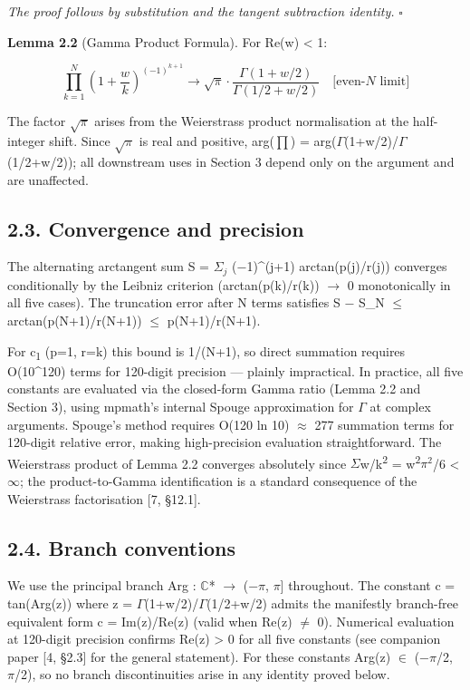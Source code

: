 \documentclass[11pt]{article}
\begin{document}
\emph{The proof follows by substitution and the tangent subtraction
identity.} \(\square\)

\textbf{Lemma 2.2} (Gamma Product Formula). For Re(w) \textless{} 1:

\[\prod_{k=1}^{N} \left(1+\frac{w}{k}\right)^{(-1)^{k+1}} \to \sqrt{\pi} \cdot \frac{\Gamma(1+w/2)}{\Gamma(1/2+w/2)} \quad \text{[even-}N\text{ limit]}\]

The factor \(\sqrt{\pi}\) arises from the Weierstrass product
normalisation at the half-integer shift. Since \(\sqrt{\pi}\) is real
and positive, arg(\(\prod\)) =
arg(\(\Gamma\)(1+w/2)/\(\Gamma\)(1/2+w/2)); all downstream uses in
Section 3 depend only on the argument and are unaffected.

\hypertarget{convergence-and-precision}{%
\subsection{2.3. Convergence and
precision}\label{convergence-and-precision}}

The alternating arctangent sum S = \(\Sigma _{j}\) (−1)\^{}(j+1)
arctan(p(j)/r(j)) converges conditionally by the Leibniz criterion
(arctan(p(k)/r(k)) \(\to\) 0 monotonically in all five cases). The
truncation error after N terms satisfies \textbar S − S\_N\textbar{}
\(\leq\) arctan(p(N+1)/r(N+1)) \(\leq\) p(N+1)/r(N+1).

For c\textsubscript{1} (p=1, r=k) this bound is 1/(N+1), so direct
summation requires O(10\^{}120) terms for 120-digit precision ---
plainly impractical. In practice, all five constants are evaluated via
the closed-form Gamma ratio (Lemma 2.2 and Section 3), using mpmath's
internal Spouge approximation for \(\Gamma\) at complex arguments.
Spouge's method requires O(120 ln 10) \(\approx\) 277 summation terms
for 120-digit relative error, making high-precision evaluation
straightforward. The Weierstrass product of Lemma 2.2 converges
absolutely since \(\Sigma\)\textbar w/k\textbar{}\textsuperscript{2} =
\textbar w\textbar{}\textsuperscript{2}\(\pi^{2}\)/6 \textless{}
\(\infty\); the product-to-Gamma identification is a standard
consequence of the Weierstrass factorisation {[}7, §12.1{]}.

\hypertarget{branch-conventions}{%
\subsection{2.4. Branch conventions}\label{branch-conventions}}

We use the principal branch Arg : \(\mathbb{C}\)* \(\to\) (−\(\pi\),
\(\pi\){]} throughout. The constant c = \textbar tan(Arg(z))\textbar{}
where z = \(\Gamma\)(1+w/2)/\(\Gamma\)(1/2+w/2) admits the manifestly
branch-free equivalent form c = \textbar Im(z)/Re(z)\textbar{} (valid
when Re(z) \(\neq\) 0). Numerical evaluation at 120-digit precision
confirms Re(z) \textgreater{} 0 for all five constants (see companion
paper {[}4, §2.3{]} for the general statement). For these constants
Arg(z) \(\in\) (−\(\pi\)/2, \(\pi\)/2), so no branch discontinuities
arise in any identity proved below.
\end{document}
